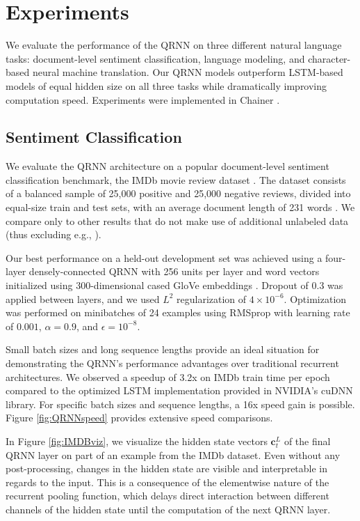 \documentclass{article} %
\begin{document}
\section{Experiments}
We evaluate the performance of the QRNN on three different natural language tasks: document-level sentiment classification, language modeling, and character-based neural machine translation. Our QRNN models outperform LSTM-based models of equal hidden size on all three tasks while dramatically improving computation speed. Experiments were implemented in Chainer \citep{Tokui2015}.

\subsection{Sentiment Classification}

We evaluate the QRNN architecture on a popular document-level sentiment classification benchmark, the IMDb movie review dataset \citep{Maas2011}. The dataset consists of a balanced sample of 25,000 positive and 25,000 negative reviews, divided into equal-size train and test sets, with an average document length of 231 words \citep{Wang2012}. We compare only to other results that do not make use of additional unlabeled data (thus excluding e.g., \citet{Miyato2016}).

Our best performance on a held-out development set was achieved using a four-layer densely-connected QRNN with 256 units per layer and word vectors initialized using 300-dimensional cased GloVe embeddings \citep{Pennington2014}. Dropout of 0.3 was applied between layers, and we used $L^2$ regularization of $4\times 10^{-6}$.
Optimization was performed on minibatches of 24 examples using RMSprop \citep{Tieleman2012} with learning rate of $0.001$, $\alpha=0.9$, and $\epsilon=10^{-8}$.

Small batch sizes and long sequence lengths provide an ideal situation for demonstrating the QRNN's performance advantages over traditional recurrent architectures.
We observed a speedup of 3.2x on IMDb train time per epoch compared to the optimized LSTM implementation provided in NVIDIA's cuDNN library.
For specific batch sizes and sequence lengths, a 16x speed gain is possible.
Figure \ref{fig:QRNNspeed} provides extensive speed comparisons.

In Figure \ref{fig:IMDBviz}, we visualize the hidden state vectors $\mathbf{c}^L_t$ of the final QRNN layer on part of an example from the IMDb dataset.
Even without any post-processing, changes in the hidden state are visible and interpretable in regards to the input. This is a consequence of the elementwise nature of the recurrent pooling function, which delays direct interaction between different channels of the hidden state until the computation of the next QRNN layer.
\end{document}
